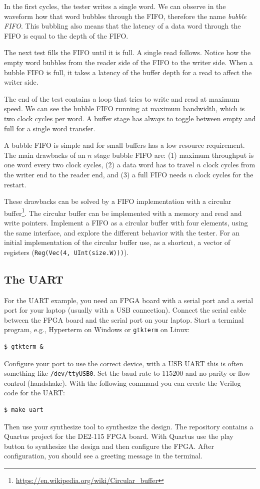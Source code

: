 \documentclass[%
    10pt,
    headinclude, footexclude,
    openright, %
    notitlepage,
    cleardoubleempty,
    headsepline,
    pointlessnumbers,
    bibtotoc, idxtotoc,
    ]{scrbook}
\newcommand{\code}[1]{{\small{\texttt{#1}}}}
\newcommand{\myref}[2]{\href{#1}{#2}}
\renewcommand{\myref}[2]{{#2}{\footnote{\url{#1}}}}
\begin{document}
In the first cycles, the tester writes a single word. We can observe in
the waveform how that word bubbles through the FIFO, therefore the
name \emph{bubble FIFO}. This bubbling also means that the
latency of a data word through the FIFO is equal to the depth of the FIFO.

The next test fills the FIFO until it is full. A single read follows.
Notice how the empty word bubbles from the reader side of the FIFO
to the writer side. When a bubble FIFO is full, it takes
a latency of the buffer depth for a read to affect the writer side. 

The end of the test contains a loop that tries to write and read at maximum speed.
We can see the bubble FIFO running at maximum bandwidth, which is two
clock cycles per word. A buffer stage has always to toggle between empty
and full for a single word transfer.

A bubble FIFO is simple and for small buffers has a low resource requirement.
The main drawbacks of an $n$ stage bubble FIFO are: (1) maximum throughput is
one word every two clock cycles, (2) a data word has to travel $n$ clock cycles
from the writer end to the reader end, and (3) a full FIFO needs $n$ clock cycles
for the restart.

These drawbacks can be solved by a FIFO implementation with a
\myref{https://en.wikipedia.org/wiki/Circular_buffer}{circular buffer}.
The circular buffer can be implemented with a memory and
read and write pointers.
Implement a FIFO as a circular buffer with four elements, using the same
interface, and explore the different behavior with the tester.
For an initial implementation of the circular buffer use, as a shortcut,
a vector of registers (\code{Reg(Vec(4, UInt(size.W)))}).

\subsection{The UART}

For the UART example, you need an FPGA board with a serial port and
a serial port for your laptop (usually with a USB connection).
Connect the serial cable between the FPGA board and the serial port on
your laptop. Start a terminal program, e.g., Hyperterm on Windows
or \code{gtkterm} on Linux:
\begin{verbatim}
$ gtkterm &
\end{verbatim}
Configure your port to use the correct device, with a USB UART this
is often something like \code{/dev/ttyUSB0}. Set the baud rate to 115200
and no parity or flow control (handshake).
With the following command you can create the Verilog code for the UART:
\begin{verbatim}
$ make uart
\end{verbatim}
Then use your synthesize tool to synthesize the design.
The repository contains a Quartus project for the DE2-115 FPGA board.
With Quartus use the play button to synthesize the design and then configure
the FPGA.
After configuration, you should see a greeting message in the terminal.
\end{document}
